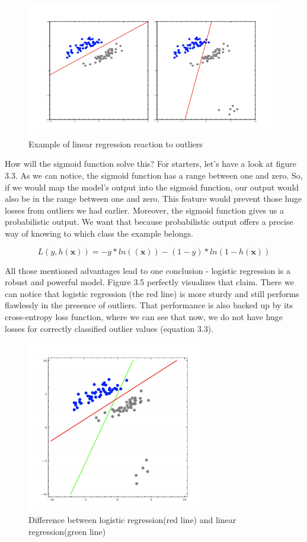 \documentclass[times, utf8, seminar]{fer}
\begin{document}
\begin{figure}[h]
	\centering
	\includegraphics[width=12cm]{linear-regression}
	\caption{Example of linear regression reaction to outliers \protect \footnotemark}
\end{figure}


How will the sigmoid function solve this? 
For starters, let's have a look at figure 3.3. As we can notice, the sigmoid function has a range between one and zero. So, if we would map the model's output into the sigmoid function, our output would also be in the range between one and zero. This feature would prevent those huge losses from outliers we had earlier. Moreover, the sigmoid function gives us a probabilistic output. We want that because probabilistic output offers a precise way of knowing to which class the example belongs. 

\begin{equation}
	L(y,h(\textbf{x})) = - y*ln((\textbf{x})) - (1-y)*ln(1-h(\textbf{x}))
\end{equation}

All those mentioned advantages lead to one conclusion - logistic regression is a robust and powerful model. Figure 3.5 perfectly visualizes that claim. There we can notice that logistic regression (the red line) is more sturdy and still performs flawlessly in the presence of outliers. That performance is also backed up by its cross-entropy loss function, where we can see that now, we do not have huge losses for correctly classified outlier values (equation 3.3). 


\begin{figure}[h]
	\centering
	\includegraphics[width=8cm]{logistic}
	\caption{Difference between logistic regression(red line) and linear regression(green line) \protect \footnotemark}
\end{figure}
\end{document}
